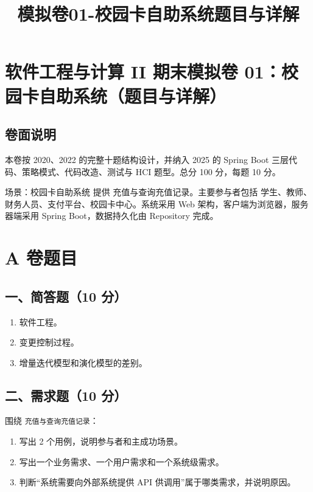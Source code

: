 \documentclass[UTF8,zihao=-4]{ctexart}
\title{模拟卷01-校园卡自助系统题目与详解}
\author{}
\date{}
\begin{document}
\maketitle
\setcounter{tocdepth}{1}
\tableofcontents
\newpage
\section{软件工程与计算 II 期末模拟卷 01：校园卡自助系统（题目与详解）}


\subsection{卷面说明}


本卷按 2020、2022 的完整十题结构设计，并纳入 2025 的 Spring Boot 三层代码、策略模式、代码改造、测试与 HCI 题型。总分 100 分，每题 10 分。


场景：校园卡自助系统 提供 充值与查询充值记录。主要参与者包括 学生、教师、财务人员、支付平台、校园卡中心。系统采用 Web 架构，客户端为浏览器，服务器端采用 Spring Boot，数据持久化由 Repository 完成。


\section{A 卷题目}


\subsection{一、简答题（10 分）}


\begin{enumerate}
\item 软件工程。
\item 变更控制过程。
\item 增量迭代模型和演化模型的差别。
\end{enumerate}


\subsection{二、需求题（10 分）}


围绕 \texttt{充值与查询充值记录}：


\begin{enumerate}
\item 写出 2 个用例，说明参与者和主成功场景。
\item 写出一个业务需求、一个用户需求和一个系统级需求。
\item 判断“系统需要向外部系统提供 API 供调用”属于哪类需求，并说明原因。
\end{enumerate}
\end{document}
